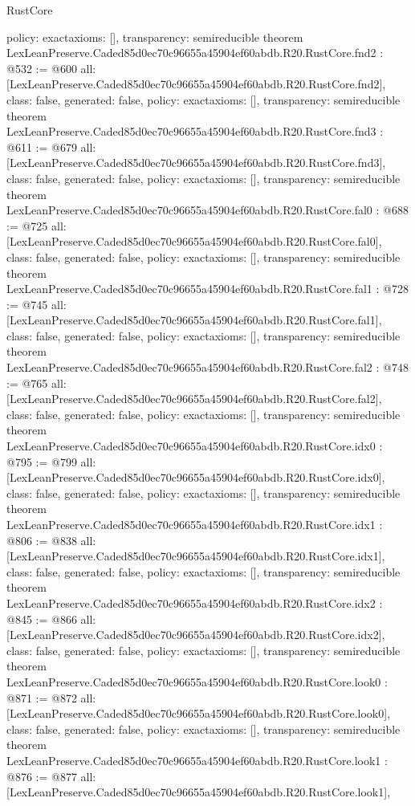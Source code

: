 \begin{lexlean}{RustCore}
\begin{coremodule}
{  policy: exact{axioms: []},
  transparency: semireducible
}
theorem LexLeanPreserve.Caded85d0ec70c96655a45904ef60abdb.R20.RustCore.fnd2 : @532 := @600 {
  all: [LexLeanPreserve.Caded85d0ec70c96655a45904ef60abdb.R20.RustCore.fnd2],
  class: false,
  generated: false,
  policy: exact{axioms: []},
  transparency: semireducible
}
theorem LexLeanPreserve.Caded85d0ec70c96655a45904ef60abdb.R20.RustCore.fnd3 : @611 := @679 {
  all: [LexLeanPreserve.Caded85d0ec70c96655a45904ef60abdb.R20.RustCore.fnd3],
  class: false,
  generated: false,
  policy: exact{axioms: []},
  transparency: semireducible
}
theorem LexLeanPreserve.Caded85d0ec70c96655a45904ef60abdb.R20.RustCore.fal0 : @688 := @725 {
  all: [LexLeanPreserve.Caded85d0ec70c96655a45904ef60abdb.R20.RustCore.fal0],
  class: false,
  generated: false,
  policy: exact{axioms: []},
  transparency: semireducible
}
theorem LexLeanPreserve.Caded85d0ec70c96655a45904ef60abdb.R20.RustCore.fal1 : @728 := @745 {
  all: [LexLeanPreserve.Caded85d0ec70c96655a45904ef60abdb.R20.RustCore.fal1],
  class: false,
  generated: false,
  policy: exact{axioms: []},
  transparency: semireducible
}
theorem LexLeanPreserve.Caded85d0ec70c96655a45904ef60abdb.R20.RustCore.fal2 : @748 := @765 {
  all: [LexLeanPreserve.Caded85d0ec70c96655a45904ef60abdb.R20.RustCore.fal2],
  class: false,
  generated: false,
  policy: exact{axioms: []},
  transparency: semireducible
}
theorem LexLeanPreserve.Caded85d0ec70c96655a45904ef60abdb.R20.RustCore.idx0 : @795 := @799 {
  all: [LexLeanPreserve.Caded85d0ec70c96655a45904ef60abdb.R20.RustCore.idx0],
  class: false,
  generated: false,
  policy: exact{axioms: []},
  transparency: semireducible
}
theorem LexLeanPreserve.Caded85d0ec70c96655a45904ef60abdb.R20.RustCore.idx1 : @806 := @838 {
  all: [LexLeanPreserve.Caded85d0ec70c96655a45904ef60abdb.R20.RustCore.idx1],
  class: false,
  generated: false,
  policy: exact{axioms: []},
  transparency: semireducible
}
theorem LexLeanPreserve.Caded85d0ec70c96655a45904ef60abdb.R20.RustCore.idx2 : @845 := @866 {
  all: [LexLeanPreserve.Caded85d0ec70c96655a45904ef60abdb.R20.RustCore.idx2],
  class: false,
  generated: false,
  policy: exact{axioms: []},
  transparency: semireducible
}
theorem LexLeanPreserve.Caded85d0ec70c96655a45904ef60abdb.R20.RustCore.look0 : @871 := @872 {
  all: [LexLeanPreserve.Caded85d0ec70c96655a45904ef60abdb.R20.RustCore.look0],
  class: false,
  generated: false,
  policy: exact{axioms: []},
  transparency: semireducible
}
theorem LexLeanPreserve.Caded85d0ec70c96655a45904ef60abdb.R20.RustCore.look1 : @876 := @877 {
  all: [LexLeanPreserve.Caded85d0ec70c96655a45904ef60abdb.R20.RustCore.look1],
}
\end{coremodule}
\end{lexlean}
